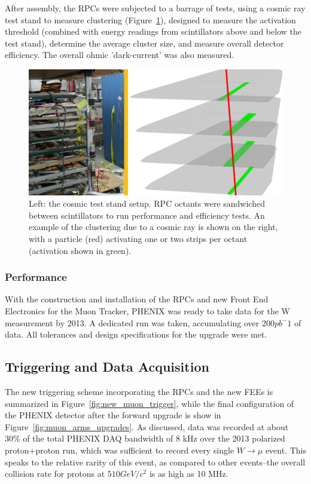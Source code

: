 
After assembly, the RPCs were subjected to a barrage of tests, using a cosmic
ray test stand to measure clustering (Figure~\ref{fig:rpc_cosmics_test_stand}),
designed to measure the activation threshold (combined with energy readings from
scintillators above and below the test stand), determine the average cluster
size, and measure overall detector efficiency. The overall ohmic 'dark-current'
was also measured.

\begin{figure}
  \centering
  \includegraphics[width=\linewidth]{./figures/rpc_cosmics_test_stand}
  \caption{
    Left: the cosmic test stand setup. RPC octants were sandwiched between
    scintillators to run performance and efficiency tests. An example of the
    clustering due to a cosmic ray is shown on the right, with a particle (red)
    activating one or two strips per octant (activation shown in green).
  }
  \label{fig:rpc_cosmics_test_stand}
\end{figure}

\subsubsection{Performance}

With the construction and installation of the RPCs and new Front End Electronics
for the Muon Tracker, PHENIX was ready to take data for the W measurement by
2013. A dedicated run was taken, accumulating over $200 pb^-1$ of data. All
tolerances and design specifications for the upgrade were met.

\subsection{Triggering and Data Acquisition}

The new triggering scheme incorporating the RPCs and the new FEEs is summarized
in Figure~\ref{fig:new_muon_trigger}, while the final configuration of the
PHENIX detector after the forward upgrade is show in
Figure~\ref{fig:muon_arms_upgrades}. As discussed, data was recorded at about
30\% of the total PHENIX DAQ bandwidth of 8 kHz over the 2013 polarized
proton+proton run, which was sufficient to record every single $W\rightarrow\mu$
event. This speaks to the relative rarity of this event, as compared to other
events--the overall collision rate for protons at $510 GeV/c^2$ is as high as
10 MHz.

